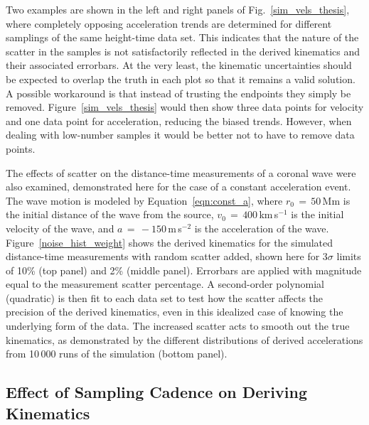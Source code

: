 \documentclass[structabstract]{aa}
\begin{document}
 
Two examples are shown in the left and right panels of Fig.~\ref{sim_vels_thesis}, where completely opposing acceleration trends are determined for different samplings of the same height-time data set. This indicates that the nature of the scatter in the samples is not satisfactorily reflected in the derived kinematics and their associated errorbars. At the very least, the kinematic uncertainties should be expected to overlap the truth in each plot so that it remains a valid solution. A possible workaround is that instead of trusting the endpoints they simply be removed. Figure~\ref{sim_vels_thesis} would then show three data points for velocity and one data point for acceleration, reducing the biased trends. However, when dealing with low-number samples it would be better not to have to remove data points.


The effects of scatter on the distance-time measurements of a coronal wave were also examined, demonstrated here for the case of a constant acceleration event. The wave motion is modeled by Equation~\ref{eqn:const_a}, where $r_0\,=\,50$\,Mm is the initial distance of the wave from the source, $v_0\,=\,400$\,km\,s$^{-1}$ is the initial velocity of the wave, and $a\,=\,-150$\,m\,s$^{-2}$ is the acceleration of the wave. Figure~\ref{noise_hist_weight} shows the derived kinematics for the simulated distance-time measurements with random scatter added, shown here for 3$\sigma$ limits of 10\% (top panel) and 2\% (middle panel). Errorbars are applied with magnitude equal to the measurement scatter percentage. A second-order polynomial (quadratic) is then fit to each data set to test how the scatter affects the precision of the derived kinematics, even in this idealized case of knowing the underlying form of the data. The increased scatter acts to smooth out the true kinematics, as demonstrated by the different distributions of derived accelerations from 10\,000 runs of the simulation (bottom panel).




\subsection{Effect of Sampling Cadence on Deriving Kinematics}
\label{subsect:cadence}
\end{document}
